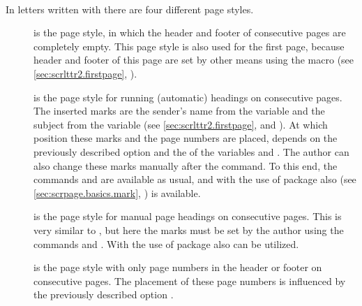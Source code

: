 \begin{Declaration}
  \\
\end{Declaration}%
%
%
%
%
%
%
In letters written with  there are four different
page styles.
\begin{description}
\item[] is the page style, in which the header and footer of
  consecutive pages are completely
  empty. This page style is also used for the first page, because
  header and footer of this page are set by other means using the
  macro  (see
  \autoref{sec:scrlttr2.firstpage}, ).
\item[] is the page style for running (automatic) headings
  on consecutive pages. The inserted marks are the sender's name from the
  variable  and the subject from
  the variable  (see
  \autoref{sec:scrlttr2.firstpage},
   and
  ).  At which position these
  marks and the page numbers are placed, depends on the previously described
  option  and the  of the variables
   and
  . The author can also change
  these marks manually after the  command. To this end, the
  commands  and  are available as usual, and
  with the use of package  also  (see
  \autoref{sec:scrpage.basics.mark}, )
  is available.
\item[] is the page style for manual page headings on
  consecutive pages. This is very similar to , but
  here the marks must be set by the author using the commands
   and
  .  With the use of package
   also  can be utilized.
\item[] is the page style with only page numbers in the
  header or footer on consecutive pages. The placement of these page numbers is
  influenced by the previously described option .
\end{description}

